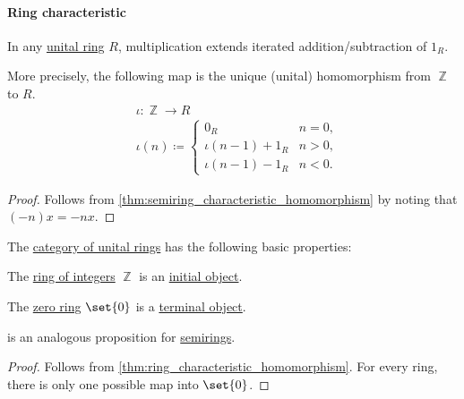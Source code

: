 \paragraph{Ring characteristic}

\begin{proposition}\label{thm:ring_characteristic_homomorphism}
  In any \hyperref[def:ring]{unital ring} \( R \), multiplication extends iterated addition/subtraction of \( 1_R \).

  More precisely, the following map is the unique (unital) homomorphism from \( \BbbZ \) to \( R \).
  \begin{equation}\label{eq:thm:ring_characteristic_homomorphism}
    \begin{aligned}
      &\iota: \BbbZ \to R \\
      &\iota(n) \coloneqq \begin{cases}
        0_R                &n = 0, \\
        \iota(n - 1) + 1_R &n > 0, \\
        \iota(n - 1) - 1_R &n < 0.
      \end{cases}
    \end{aligned}
  \end{equation}
\end{proposition}
\begin{proof}
  Follows from \cref{thm:semiring_characteristic_homomorphism} by noting that \( (-n)x = -nx \).
\end{proof}

\begin{proposition}\label{thm:category_of_rings_properties}
  The \hyperref[def:ring/category]{category of unital rings} has the following basic properties:
  \begin{thmenum}
     The \hyperref[def:integers]{ring of integers} \( \BbbZ \) is an \hyperref[def:universal_objects/initial]{initial object}.

     The \hyperref[def:ring/trivial]{zero ring} \( \set{ 0 } \) is a \hyperref[def:universal_objects/terminal]{terminal object}.
  \end{thmenum}
\end{proposition}
\begin{comments}
  \item {} is an analogous proposition for \hyperref[def:semiring]{semirings}.
\end{comments}
\begin{proof}
   Follows from \cref{thm:ring_characteristic_homomorphism}.
   For every ring, there is only one possible map into \( \set{ 0 } \).
\end{proof}

